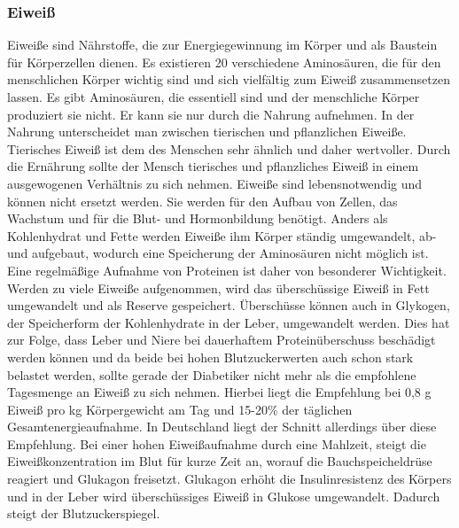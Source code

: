 	\subsubsection{Eiweiß}
		Eiweiße sind Nährstoffe, die zur Energiegewinnung im Körper und als Baustein für Körperzellen dienen. Es existieren 20 verschiedene Aminosäuren, die für den menschlichen Körper wichtig sind und sich vielfältig zum Eiweiß zusammensetzen lassen. Es gibt Aminosäuren, die essentiell sind und der menschliche Körper produziert sie nicht. Er kann sie nur durch die Nahrung aufnehmen. In der Nahrung unterscheidet man zwischen tierischen und pflanzlichen Eiweiße. Tierisches Eiweiß ist dem des Menschen sehr ähnlich und daher wertvoller. Durch die Ernährung sollte der Mensch tierisches und pflanzliches Eiweiß in einem ausgewogenen Verhältnis zu sich nehmen. Eiweiße sind lebensnotwendig und können nicht ersetzt werden.\cite{ND} Sie werden für den Aufbau von Zellen, das Wachstum und für die Blut- und Hormonbildung benötigt. \newline
		Anders als Kohlenhydrat und Fette werden Eiweiße ihm Körper ständig umgewandelt, ab- und aufgebaut, wodurch eine Speicherung der Aminosäuren nicht möglich ist. Eine regelmäßige Aufnahme von Proteinen ist daher von besonderer Wichtigkeit. \newline
		Werden zu viele Eiweiße aufgenommen, wird das überschüssige Eiweiß in Fett umgewandelt und als Reserve gespeichert. Überschüsse können auch in Glykogen, der Speicherform der Kohlenhydrate in der Leber, umgewandelt werden. Dies hat zur Folge, dass Leber und Niere bei dauerhaftem Proteinüberschuss beschädigt werden können und da beide bei hohen Blutzuckerwerten auch schon stark belastet werden, sollte gerade der Diabetiker nicht mehr als die empfohlene Tagesmenge an Eiweiß zu sich nehmen.\cite{SG} Hierbei liegt die Empfehlung bei 0,8 g Eiweiß pro kg Körpergewicht am Tag und 15-20\% der täglichen Gesamtenergieaufnahme. In Deutschland liegt der Schnitt allerdings über diese Empfehlung.\cite{ND}\newline
		Bei einer hohen Eiweißaufnahme durch eine Mahlzeit, steigt die Eiweißkonzentration im Blut für kurze Zeit an, worauf die Bauchspeicheldrüse reagiert und Glukagon freisetzt. Glukagon erhöht die Insulinresistenz des Körpers und in der Leber wird überschüssiges Eiweiß in Glukose umgewandelt. Dadurch steigt der Blutzuckerspiegel.\cite{SG}

